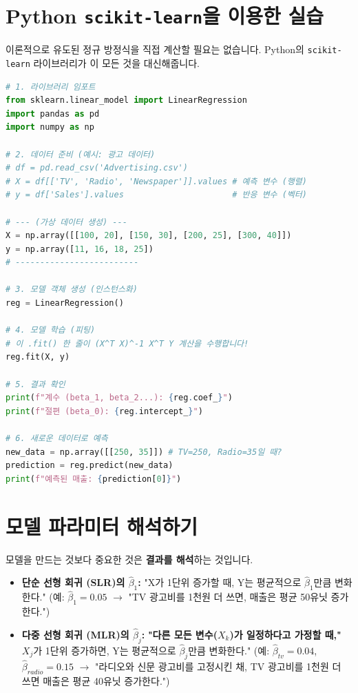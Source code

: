 \documentclass[11pt,a4paper]{book}
\theoremstyle{definition}
\begin{document}
\section{Python \texttt{scikit-learn}을 이용한 실습}

이론적으로 유도된 정규 방정식을 직접 계산할 필요는 없습니다. Python의 \texttt{scikit-learn} 라이브러리가 이 모든 것을 대신해줍니다.

\begin{codeexample}
\begin{lstlisting}[language=Python, caption={scikit-learn을 이용한 선형 회귀 학습}, label={lst:sklearn}, breaklines=true]
# 1. 라이브러리 임포트
from sklearn.linear_model import LinearRegression
import pandas as pd
import numpy as np

# 2. 데이터 준비 (예시: 광고 데이터)
# df = pd.read_csv('Advertising.csv')
# X = df[['TV', 'Radio', 'Newspaper']].values # 예측 변수 (행렬)
# y = df['Sales'].values                      # 반응 변수 (벡터)

# --- (가상 데이터 생성) ---
X = np.array([[100, 20], [150, 30], [200, 25], [300, 40]])
y = np.array([11, 16, 18, 25])
# -------------------------

# 3. 모델 객체 생성 (인스턴스화)
reg = LinearRegression()

# 4. 모델 학습 (피팅)
# 이 .fit() 한 줄이 (X^T X)^-1 X^T Y 계산을 수행합니다!
reg.fit(X, y)

# 5. 결과 확인
print(f"계수 (beta_1, beta_2...): {reg.coef_}")
print(f"절편 (beta_0): {reg.intercept_}")

# 6. 새로운 데이터로 예측
new_data = np.array([[250, 35]]) # TV=250, Radio=35일 때?
prediction = reg.predict(new_data)
print(f"예측된 매출: {prediction[0]}")
\end{lstlisting}
\end{codeexample}

\section{모델 파라미터 해석하기}

모델을 만드는 것보다 중요한 것은 \textbf{결과를 해석}하는 것입니다.

\begin{itemize}
    \item \textbf{단순 선형 회귀 (SLR)의 $\hat{\beta}_1$:}
    "X가 1단위 증가할 때, Y는 평균적으로 $\hat{\beta}_1$만큼 변화한다."
    (예: $\hat{\beta}_1 = 0.05$ $\rightarrow$ "TV 광고비를 1천원 더 쓰면, 매출은 평균 50유닛 증가한다.")
    
    \item \textbf{다중 선형 회귀 (MLR)의 $\hat{\beta}_j$:}
    \textbf{"다른 모든 변수($X_k$)가 일정하다고 가정할 때,"} $X_j$가 1단위 증가하면, Y는 평균적으로 $\hat{\beta}_j$만큼 변화한다."
    (예: $\hat{\beta}_{tv} = 0.04$, $\hat{\beta}_{radio} = 0.15$ $\rightarrow$ "라디오와 신문 광고비를 고정시킨 채, TV 광고비를 1천원 더 쓰면 매출은 평균 40유닛 증가한다.")
\end{itemize}
\end{document}
